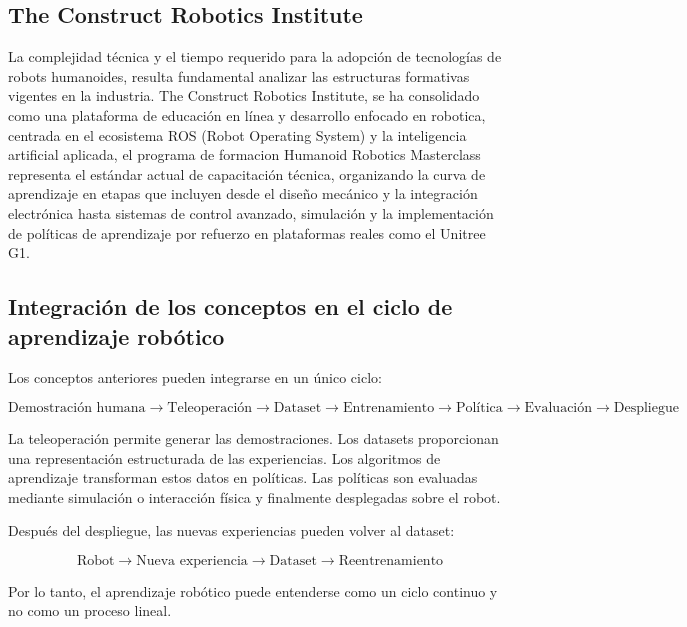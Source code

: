 \documentclass[stu,12pt,floatsintext]{apa7}
\begin{document}
\subsection{The Construct Robotics Institute}
La complejidad técnica y el tiempo requerido para la adopción de tecnologías de robots humanoides, resulta fundamental analizar las estructuras formativas vigentes en la industria. The Construct Robotics Institute, se ha consolidado como una plataforma de educación en línea y desarrollo enfocado en robotica, centrada en el ecosistema ROS (Robot Operating System) y la inteligencia artificial aplicada, el programa de formacion Humanoid Robotics Masterclass \parencite{theconstruct2026humanoid} representa el estándar actual de capacitación técnica, organizando la curva de aprendizaje en etapas que incluyen desde el diseño mecánico y la integración electrónica hasta sistemas de control avanzado, simulación y la implementación de políticas de aprendizaje por refuerzo  en plataformas reales como el Unitree G1.

\subsection{Integración de los conceptos en el ciclo de aprendizaje robótico}

Los conceptos anteriores pueden integrarse en un único ciclo:

\begin{equation}
\boxed{
\text{Demostración humana}
\rightarrow
\text{Teleoperación}
\rightarrow
\text{Dataset}
\rightarrow
\text{Entrenamiento}
\rightarrow
\text{Política}
\rightarrow
\text{Evaluación}
\rightarrow
\text{Despliegue}
}
\end{equation}

La teleoperación permite generar las demostraciones. Los datasets proporcionan una representación estructurada de las experiencias. Los algoritmos de aprendizaje transforman estos datos en políticas. Las políticas son evaluadas mediante simulación o interacción física y finalmente desplegadas sobre el robot.

Después del despliegue, las nuevas experiencias pueden volver al dataset:

\begin{equation}
\text{Robot}
\rightarrow
\text{Nueva experiencia}
\rightarrow
\text{Dataset}
\rightarrow
\text{Reentrenamiento}
\end{equation}

Por lo tanto, el aprendizaje robótico puede entenderse como un ciclo continuo y no como un proceso lineal.
\end{document}
